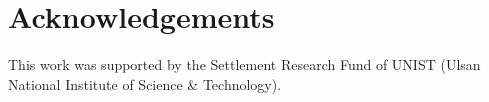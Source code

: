 \documentclass[a4paper,fleqn]{cas-sc}
\begin{document}




% 

\printcredits

\section*{Acknowledgements}
This work was supported by the Settlement Research Fund of UNIST (Ulsan National Institute of Science \& Technology).

%





\end{document}

